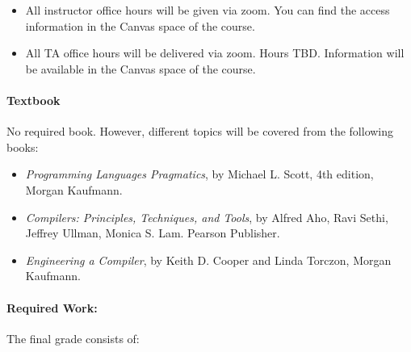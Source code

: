 \documentclass[11pt, epsfig]{article}
\begin{document}
\begin{itemize}

\item 
All instructor office hours will be given via zoom. You can find the access information in the Canvas space of the course.

\item
All TA office hours will be delivered via zoom. Hours TBD. Information will be available in the Canvas space of the course.
\end{itemize}


\paragraph{Textbook} 
No required book. However, different topics will be covered from the following books:

\begin{itemize}
\item
{\em Programming Languages Pragmatics}, by Michael L. Scott, 4th edition, Morgan Kaufmann.
\item
{\em Compilers: Principles, Techniques, and Tools}, by
Alfred Aho, Ravi Sethi, Jeffrey Ullman, Monica S. Lam. Pearson Publisher.
\item
{\em Engineering a Compiler}, by Keith D. Cooper and Linda Torczon, Morgan Kaufmann.
\end{itemize}


\paragraph{Required Work:}

The final grade consists of:
\end{document}
